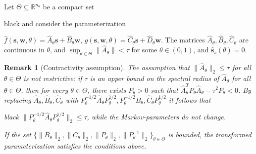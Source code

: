 \documentclass{ifacconf}
\def\rvs{{\mathbf{s}}}
\def\rvw{{\mathbf{w}}}
\def\rvy{{\mathbf{y}}}
\newtheorem{Remark}{Remark}[section]
\begin{document}
  Let $\Theta \subseteq \mathbb{R}^{n_{\theta}}$ be a compact set \begin{color}{black} and
  consider the parameterization \end{color} $\hat{f}(\rvs,\rvw,\theta)=\hat{A}_\theta\rvs+\hat{B}_\theta\rvw$,
  $\hat{g}(\rvs,\rvw,\theta)=\hat{C}_\theta\rvs+\hat{D}_\theta\rvw$. The matrices $\hat{A}_{\theta},\hat{B}_{\theta},\hat{C}_{\theta}$
  are continuous in $\theta$, and $\sup_{\theta \in \Theta}\|\hat{A}_{\theta}\| < \tau $ for some $\theta \in (0,1)$, and $\hat{\rvs}_{s}(\theta)=0$. 
 \begin{Remark}[Contractivity assumption]\label{rem::contract}
  The assumption that $\|\hat{A}_{\theta}\|_2 \le \tau$ for all $\theta \in \Theta$ is not restrictive: if $\tau$ is an upper bound on 
  the spectral radius of $\hat{A}_{\theta}$ for all $\theta \in \Theta$, then 
  for every $\theta \in \Theta$, there exists $P_{\theta} > 0$ such that
  $\hat{A}_{\theta}^TP_{\theta}\hat{A}_{\theta}-\tau^2 P_{\theta} < 0$. 
  By replacing $\hat{A}_{\theta},\hat{B}_{\theta},\hat{C}_{\theta}$ with $P_{\theta}^{-1/2}\hat{A}_{\theta}P_{\theta}^{1/2},P_{\theta}^{-1/2}\hat{B}_{\theta},\hat{C}_{\theta}P_{\theta}^{1/2}$ it follows that \begin{color}{black}
  $\|P_{\theta}^{-1/2}\hat{A}_{\theta}P_{\theta}^{1/2}\|_{2} \le \tau$, while the Markov-parameters do not change. \end{color}
  If the set $\{\|B_{\theta}\|_{2},\|C_{\theta}\|_{2}, \|P_{\theta}\|_{2},\|P_{\theta}^{-1}\|_{2}\}_{\theta \in \Theta}$ is bounded, the transformed parameterization satisfies the conditions above.
 \end{Remark}
\end{document}
